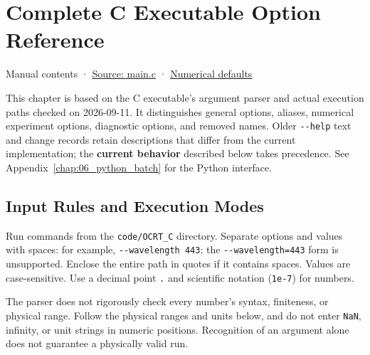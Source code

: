 \chapter{Complete C Executable Option Reference}
\label{chap:03_options}
Manual contents · \href{https://github.com/brtnt/OCRT/blob/54861c68e35ec5aaa3938fad53e93dc2dfa7eb1d/code/OCRT_C/src/main.c}{Source: main.c} · \href{https://github.com/brtnt/OCRT/blob/54861c68e35ec5aaa3938fad53e93dc2dfa7eb1d/code/OCRT_C/src/rt_types.h}{Numerical defaults}

This chapter is based on the C executable's argument parser and actual execution paths checked on 2026-09-11. It distinguishes general options, aliases, numerical experiment options, diagnostic options, and removed names. Older \texttt{-\allowbreak{}-\allowbreak{}help} text and change records retain descriptions that differ from the current implementation; the \textbf{current behavior} described below takes precedence. See Appendix~\ref{chap:06_python_batch} for the Python interface.

\section{Input Rules and Execution Modes}
\label{sec:auto:03_options:1}
Run commands from the \texttt{code/\allowbreak{}OCRT\_\allowbreak{}C} directory. Separate options and values with spaces: for example, \texttt{-\allowbreak{}-\allowbreak{}wavelength 443}; the \texttt{-\allowbreak{}-\allowbreak{}wavelength=\allowbreak{}443} form is unsupported. Enclose the entire path in quotes if it contains spaces. Values are case-sensitive. Use a decimal point \texttt{.\allowbreak{}} and scientific notation (\texttt{1e-\allowbreak{}7}) for numbers.

The parser does not rigorously check every number's syntax, finiteness, or physical range. Follow the physical ranges and units below, and do not enter \texttt{NaN}, infinity, or unit strings in numeric positions. Recognition of an argument alone does not guarantee a physically valid run.


